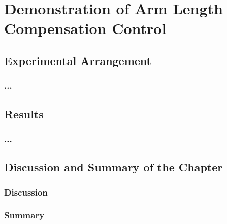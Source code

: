 \chapter{Demonstration of Arm Length Compensation Control}
\section{Experimental Arrangement}
\subsection{...}
\section{Results}
\subsection{...}
\section{Discussion and Summary of the Chapter}
\subsection{Discussion}
\subsection{Summary}

